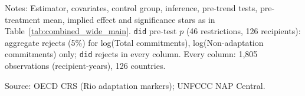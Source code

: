 \begin{table}[H]
\centering
\caption{Effect of NAP adoption on climate finance: simple ATT across outcomes (main specification, panel 2010--2024)}
\label{tab:combined_wide_2010}
\begingroup\small
{}
\endgroup
\par\vspace{4pt}
\begin{minipage}{\linewidth}\footnotesize
Notes: Estimator, covariates, control group, inference, pre-trend tests, pre-treatment mean, implied effect and significance stars as in Table~\ref{tab:combined_wide_main}. \texttt{did} pre-test $p$ (46 restrictions, 126 recipients): aggregate rejects (5\%) for log(Total commitments), log(Non-adaptation commitments) only; \texttt{did} rejects in every column. Every column: 1,805 observations (recipient-years), 126 countries.\par
Source: OECD CRS (Rio adaptation markers); UNFCCC NAP Central.
\end{minipage}
\end{table}
